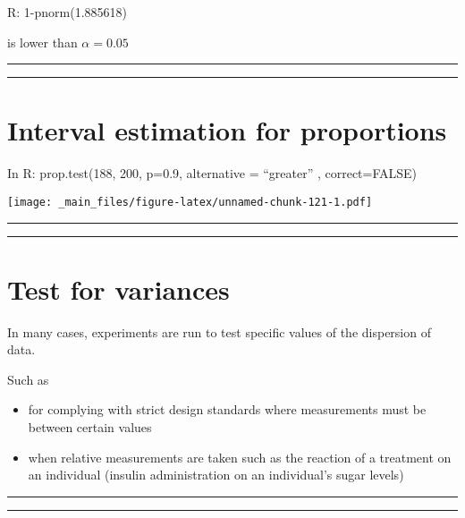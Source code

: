 \documentclass[
]{book}
\providecommand{\tightlist}{%
  \setlength{\itemsep}{0pt}\setlength{\parskip}{0pt}}
\begin{document}
R: 1-pnorm(1.885618)

is lower than \(\alpha=0.05\)

\begin{center}\rule{0.5\linewidth}{0.5pt}\end{center}

\begin{center}\rule{0.5\linewidth}{0.5pt}\end{center}

\hypertarget{interval-estimation-for-proportions-8}{%
\section{Interval estimation for proportions}\label{interval-estimation-for-proportions-8}}

In R: prop.test(188, 200, p=0.9, alternative = ``greater'' , correct=FALSE)

\texttt{[image: \_main\_files/figure-latex/unnamed-chunk-121-1.pdf]}

\begin{center}\rule{0.5\linewidth}{0.5pt}\end{center}

\begin{center}\rule{0.5\linewidth}{0.5pt}\end{center}

\hypertarget{test-for-variances}{%
\section{Test for variances}\label{test-for-variances}}

In many cases, experiments are run to test specific values of the dispersion of data.

Such as

\begin{itemize}
\tightlist
\item
  for complying with strict design standards where measurements must be between certain values
\item
  when relative measurements are taken such as the reaction of a treatment on an individual (insulin administration on an individual's sugar levels)
\end{itemize}

\begin{center}\rule{0.5\linewidth}{0.5pt}\end{center}

\begin{center}\rule{0.5\linewidth}{0.5pt}\end{center}
\end{document}
